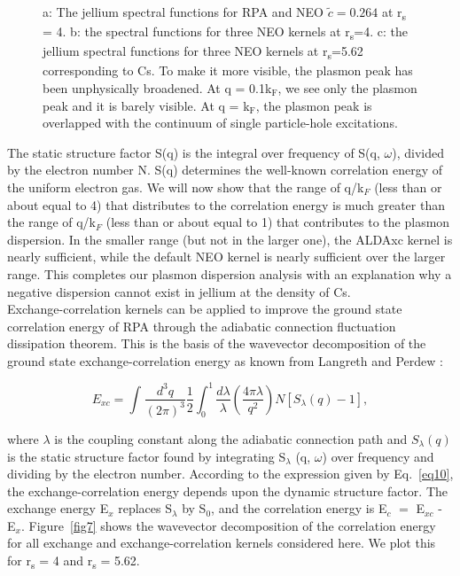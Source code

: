\documentclass[aps,amsmath,amssymb, preprint, 12pt]{revtex4-1}
\begin{document}
\begin{figure}[h!]
	\caption{a: The jellium spectral functions for RPA and NEO\textbf{  \( \widetilde{c}=0.264 \) } at r\textsubscript{s }= 4. b: the spectral functions for three NEO kernels at r\textsubscript{s}=4. c: the jellium spectral functions for three NEO kernels at r\textsubscript{s}=5.62 corresponding to Cs. {\color{red} To make it more visible, the plasmon peak has been unphysically broadened. At q = 0.1k$_\text{F}$, we see only the plasmon peak and it is barely visible. At q = k$_\text{F}$, the plasmon peak is overlapped with the continuum of single particle-hole excitations.}}
	\label{fig6}
\end{figure}






The static structure factor S(q) is the integral over frequency of S(q, $\omega$), divided by the electron number N. S(q) determines the well-known correlation energy of the uniform electron gas. We will now show that the range of q/k$_F$ (less than or about equal to 4) that distributes to the correlation energy is much greater than the range of q/k$_F$ (less than or about equal to 1) that contributes to the plasmon dispersion. In the smaller range (but not in the larger one), the ALDAxc kernel is nearly sufficient, while the default NEO kernel is nearly sufficient over the larger range. This completes our plasmon dispersion analysis with an explanation why a negative dispersion cannot exist in jellium at the density of Cs.\\ 


Exchange-correlation kernels can be applied to improve the ground state correlation energy of RPA through the adiabatic connection fluctuation dissipation theorem. This is the basis of the wavevector decomposition of the ground state exchange-correlation energy as known from Langreth and Perdew \cite{LP77}:

\begin{equation}
 E_{xc}= \int _{}^{}\frac{d^{3}q}{ ( 2 \pi ) ^{3}}\frac{1}{2} \int _{0}^{1}\frac{d \lambda }{ \lambda } ( \frac{4 \pi  \lambda }{q^{2}} ) N [ S_{ \lambda } ( {q} ) -1 ],
 \label{eq10}
\end{equation}

\noindent where $ \lambda $  is the coupling constant along the adiabatic connection path and  \( S_{ \lambda } \left( {q} \right)  \)  is the static structure factor found by integrating S$_\lambda$ (q, $\omega$) over frequency and dividing by the electron number. According to the expression given by Eq.~\ref{eq10}, the exchange-correlation energy depends upon the dynamic structure factor. The exchange energy E$_x$ replaces S$_\lambda$ by S$_0$, and the correlation energy is E$_c$ $=$ E$_{xc}$ - E$_x$. Figure~\ref{fig7} shows the wavevector decomposition of the correlation energy for all exchange and exchange-correlation kernels considered here. We plot this for r\textsubscript{s} = 4 and r\textsubscript{s} = 5.62.\\ 
\end{document}
